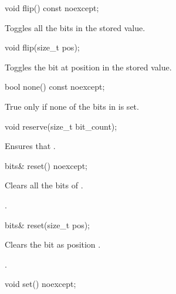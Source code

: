 \begin{itemdecl}
void flip() const noexcept;	
\end{itemdecl}

\begin{itemdescr}
\effects Toggles all the bits in the stored value. 
\end{itemdescr}

\begin{itemdecl}
void flip(size_t pos);	
\end{itemdecl}

\begin{itemdescr}
\effects Toggles the bit at position  in the stored value.
\end{itemdescr}

\begin{itemdecl}
bool none() const noexcept;	
\end{itemdecl}

\begin{itemdescr}
\returns True only if none of the bits in  is set.
\end{itemdescr}

\begin{itemdecl}
void reserve(size_t bit_count);	
\end{itemdecl}

\begin{itemdescr}
\effects Ensures that .	
\end{itemdescr}

\begin{itemdecl}
bits& reset() noexcept;	
\end{itemdecl}

\begin{itemdescr}
\effects Clears all the bits of .

\returns {}.	
\end{itemdescr}

\begin{itemdecl}
bits& reset(size_t pos);	
\end{itemdecl}

\begin{itemdescr}
\effects Clears the bit as position .

\returns {}. 	
\end{itemdescr}

\begin{itemdecl}
void set() noexcept;	
\end{itemdecl}

